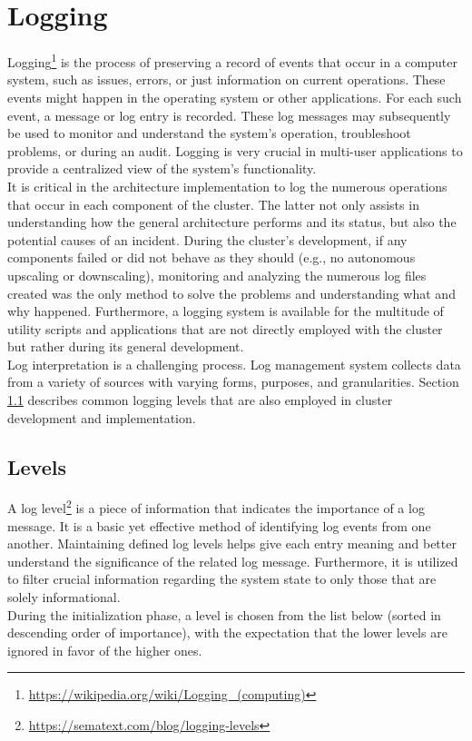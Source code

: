\chapter{Logging}
\label{cha:logging}

Logging\footnote{\url{https://wikipedia.org/wiki/Logging_(computing)}} is the process
of preserving a record of events that occur in a computer system, such as issues,
errors, or just information on current operations. These events might happen in the
operating system or other applications. For each such event, a message or log entry
is recorded. These log messages may subsequently be used to monitor and
understand the system's operation, troubleshoot problems, or during an audit. Logging
is very crucial in multi-user applications to provide a centralized view of the system's
functionality. \\ %
It is critical in the architecture implementation to log the numerous operations
that occur in each component of the cluster. The latter not only assists in
understanding how the general architecture performs and its status, but also the
potential causes of an incident. During the cluster's development, if any components
failed or did not behave as they should (e.g., no autonomous upscaling or
downscaling), monitoring and analyzing the numerous log files created was the
only method to solve the problems and understanding what and why happened. Furthermore,
a logging system is available for the multitude of utility scripts and
applications that are not directly employed with the cluster but rather during
its general development. \\ %
Log interpretation is a challenging process. Log management system collects data
from a variety of sources with varying forms, purposes, and granularities.
Section \ref{sec:logging_levels} describes common logging levels that are also
employed in cluster development and implementation.

\section{Levels}
\label{sec:logging_levels}

A log level\footnote{\url{https://sematext.com/blog/logging-levels}} is a piece of
information that indicates the importance of a log message. It is a basic yet
effective method of identifying log events from one another. Maintaining defined
log levels helps give each entry meaning and better understand the significance of
the related log message. Furthermore, it is utilized to filter crucial information
regarding the system state to only those that are solely informational. \\ %
During the initialization phase, a level is chosen from the list below (sorted in
descending order of importance), with the expectation that the lower levels are ignored
in favor of the higher ones.

